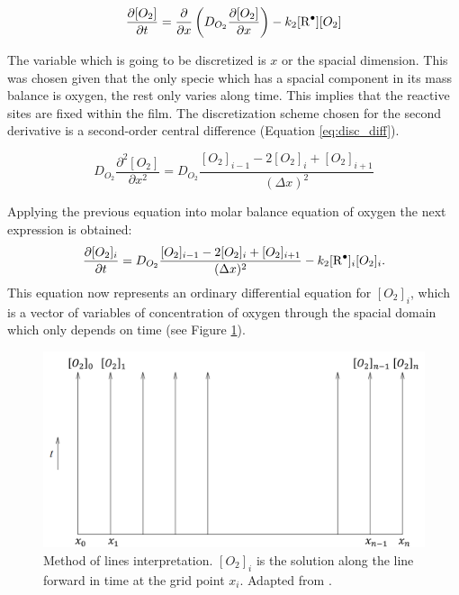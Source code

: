 \begin{refsection}
\begin{equation*}
     \frac{\partial [O_2]}{\partial t}= \frac{\partial}{\partial x} \left(D_{O_2}\frac{\partial [O_2] }{\partial x}\right) -k_2[\ce{R^.}][O_2]
\end{equation*}

The variable which is going to be discretized is $x$ or the spacial dimension. This was chosen given that the only specie which has a spacial component in its mass balance is oxygen, the rest only varies along time. This implies that the reactive sites are fixed within the film. The discretization scheme chosen for the second derivative is a second-order central difference  (Equation \ref{eq:disc_diff}). 

\begin{equation}
    D_{O_2}\frac{\partial^2 [O_2]}{\partial x^2}= D_{O_2} \frac{[O_2]_{i-1}-2[O_2]_{i}+[O_2]_{i+1}}{(\Delta x)^2}
    \label{eq:disc_diff}
\end{equation}

Applying the previous equation into molar balance equation of oxygen the next expression is obtained:
\begin{equation}
     \frac{\partial [O_2]_i}{\partial t}=  D_{O_2} \frac{[O_2]_{i-1}-2[O_2]_{i}+[O_2]_{i+1}}{(\Delta x)^2} -k_2[\ce{R^.}]_i[O_2]_i.
     \label{eq:LOD_oxygen}
\end{equation}
This equation now represents an ordinary differential equation for $[O_2]_i$, which is a vector of variables of concentration of oxygen through the spacial domain which only depends on time (see Figure \ref{fig:LOD_diagram}).

\begin{figure}[ht]
    \centering
    \includegraphics[width=0.7 \linewidth]{Documento_Latex/Tesis_1/Imagenes/LOD.png}
    \caption{Method of lines interpretation. $[O_2]_i$ is the solution along the line forward in time at the grid point $x_i$. Adapted from \cite{LeVeque2007FiniteProblems}.}
    \label{fig:LOD_diagram}
\end{figure}


\end{refsection}
